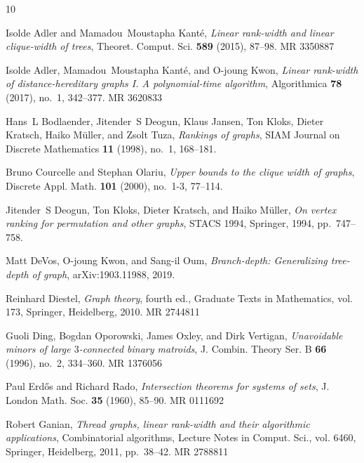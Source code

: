 \documentclass[11pt]{article}
\begin{document}
		\providecommand{\bysame}{\leavevmode\hbox to3em{\hrulefill}\thinspace}
\providecommand{\MR}{\relax\ifhmode\unskip\space\fi MR }
\providecommand{\MRhref}[2]{%
  \href{http://www.ams.org/mathscinet-getitem?mr=#1}{#2}
}
\providecommand{\href}[2]{#2}
\begin{thebibliography}{10}

Isolde Adler and Mamadou~Moustapha Kant\'{e}, \emph{Linear rank-width and
  linear clique-width of trees}, Theoret. Comput. Sci. \textbf{589} (2015),
  87--98. \MR{3350887}

Isolde Adler, Mamadou~Moustapha Kant\'{e}, and O{-}joung Kwon, \emph{Linear
  rank-width of distance-hereditary graphs {I}. {A} polynomial-time algorithm},
  Algorithmica \textbf{78} (2017), no.~1, 342--377. \MR{3620833}

Hans~L Bodlaender, Jitender~S Deogun, Klaus Jansen, Ton Kloks, Dieter Kratsch,
  Haiko M{\"u}ller, and Zsolt Tuza, \emph{Rankings of graphs}, SIAM Journal on
  Discrete Mathematics \textbf{11} (1998), no.~1, 168--181.

Bruno Courcelle and Stephan Olariu, \emph{Upper bounds to the clique width of
  graphs}, Discrete Appl. Math. \textbf{101} (2000), no.~1-3, 77--114.

Jitender~S Deogun, Ton Kloks, Dieter Kratsch, and Haiko M{\"u}ller, \emph{On
  vertex ranking for permutation and other graphs}, STACS 1994, Springer, 1994,
  pp.~747--758.

Matt DeVos, O{-}joung Kwon, and Sang{-}il Oum, \emph{Branch-depth:
  {G}eneralizing tree-depth of graph}, arXiv:1903.11988, 2019.

Reinhard Diestel, \emph{Graph theory}, fourth ed., Graduate Texts in
  Mathematics, vol. 173, Springer, Heidelberg, 2010. \MR{2744811}

Guoli Ding, Bogdan Oporowski, James Oxley, and Dirk Vertigan, \emph{Unavoidable
  minors of large {$3$}-connected binary matroids}, J. Combin. Theory Ser. B
  \textbf{66} (1996), no.~2, 334--360. \MR{1376056}

Paul Erd\H{o}s and Richard Rado, \emph{Intersection theorems for systems of
  sets}, J. London Math. Soc. \textbf{35} (1960), 85--90. \MR{0111692}

Robert Ganian, \emph{Thread graphs, linear rank-width and their algorithmic
  applications}, Combinatorial algorithms, Lecture Notes in Comput. Sci., vol.
  6460, Springer, Heidelberg, 2011, pp.~38--42. \MR{2788811}


\end{thebibliography}
\end{document}
